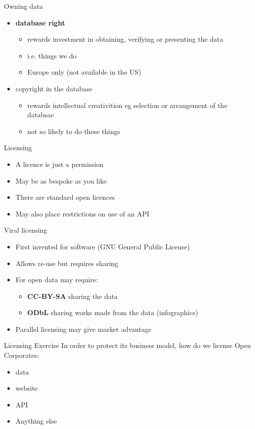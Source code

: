 \documentclass{beamer}
\begin{document}
\begin{frame}{Owning data}
  \begin{itemize}
  \item {\bf database right} 
    \begin{itemize}
    \item rewards investment in obtaining, verifying or presenting the data
    \item i.e. things we do
    \item Europe only (not available in the US)
    \end{itemize}
  \item copyright in the database
    \begin{itemize}
    \item rewards intellectual creativition eg selection or arrangement of the databsae
    \item not so likely to do these things
    \end{itemize}
\end{itemize}
\end{frame}

\begin{frame}{Licensing}
  \begin{itemize}
  \item A licence is just a permission
  \item May be as bespoke as you like
  \item There are standard open licences
  \item May also place restrictions on use of an API
  \end{itemize}
  
\end{frame}

\begin{frame}{Viral licensing}
  \begin{itemize}
  \item First invented for software (GNU General Public License)
  \item Allows re-use but requires sharing
  \item For open data may require:
    \begin{itemize}
    \item {\bf CC-BY-SA} sharing the data
    \item {\bf ODbL} sharing works made from the data (infographics)
    \end{itemize}
  \item Parallel licensing may give market advantage
  \end{itemize}
\end{frame}

\begin{frame}{Licensing Exercise}
In order to protect its business model, how do we license Open Corporates:
\begin{itemize}
\item data
\item website
\item API
\item Anything else
\end{itemize}
  
\end{frame}
\end{document}
